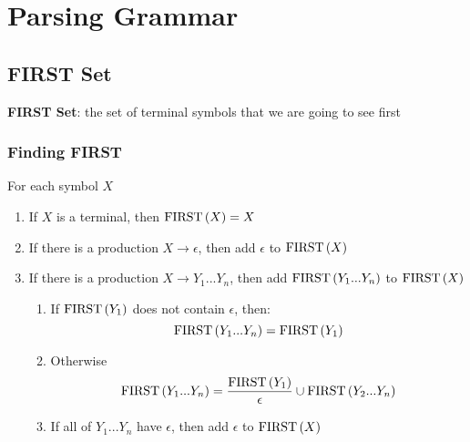 \chapter{Parsing Grammar}

\section{FIRST Set}

  \begin{definition}
    \textbf{FIRST Set}: the set of terminal symbols that we are going to see
    first
  \end{definition}

  \subsection{Finding FIRST}

    For each symbol $ X $

    \begin{enumerate}
      \item If $ X $ is a terminal, then $ \operatorname{FIRST}\left( X \right) = { X } $
      \item If there is a production $ X \to \epsilon $, then add $ \epsilon $
      to $ \operatorname{FIRST}\left( X \right) $
      \item If there is a production $ X \to Y_{1} ... Y_{n} $, then add
      $ \operatorname{FIRST}\left( Y_{1} ... Y_{n} \right) $ to $ \operatorname{FIRST}\left( X \right) $
      \begin{enumerate}
        \item If $ \operatorname{FIRST}\left( Y_{1} \right) $ does not contain $ \epsilon $,
        then:
        \begin{equation}
          \operatorname{FIRST}\left( Y_{1} ... Y_{n} \right) = \operatorname{FIRST}\left( Y_{1} \right)
        \end{equation}

        \item Otherwise
        \begin{equation}
          \operatorname{FIRST}\left( Y_{1} ... Y_{n} \right) =
            \frac{\operatorname{FIRST}\left( Y_{1} \right)}{\epsilon} \cup
            \operatorname{FIRST}\left( Y_{2} ... Y_{n} \right)
        \end{equation}

        \item If all of $ Y_{1} ... Y_{n} $ have $ \epsilon $, then add
        $ \epsilon $ to $ \operatorname{FIRST}\left( X \right) $
      \end{enumerate}
    \end{enumerate}

